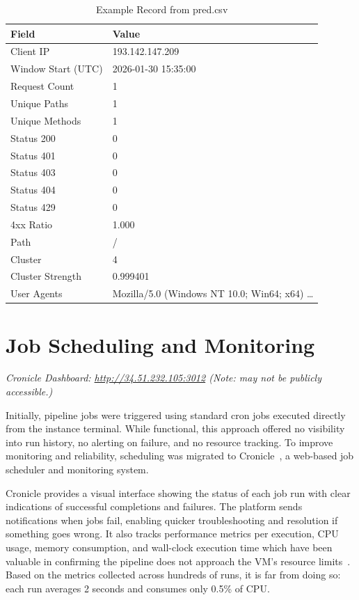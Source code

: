 \documentclass[12pt, a4paper]{report}   %
\begin{document}
\begin{table}[H]
  \centering
  \caption{Example Record from pred.csv}
  \label{tab:pred-csv}
  \begin{tabular}{ll}
    \toprule
    \textbf{Field} & \textbf{Value} \\
    \midrule
    Client IP          & 193.142.147.209 \\
    Window Start (UTC) & 2026-01-30 15:35:00 \\
    Request Count      & 1 \\
    Unique Paths       & 1 \\
    Unique Methods     & 1 \\
    Status 200         & 0 \\
    Status 401         & 0 \\
    Status 403         & 0 \\
    Status 404         & 0 \\
    Status 429         & 0 \\
    4xx Ratio          & 1.000 \\
    Path               & / \\
    Cluster            & 4 \\
    Cluster Strength   & 0.999401 \\
    User Agents        & Mozilla/5.0 (Windows NT 10.0; Win64; x64) \ldots \\
    \bottomrule
  \end{tabular}
\end{table}

\section{Job Scheduling and Monitoring} 

\noindent\textit{\small Cronicle Dashboard: 
\href{http://34.51.232.105:3012}{http://34.51.232.105:3012} 
(Note: may not be publicly accessible.)}

\vspace{0.5em}

Initially, pipeline jobs were triggered using standard cron jobs executed directly
from the instance terminal. While functional, this approach offered no visibility
into run history, no alerting on failure, and no resource tracking. To improve
monitoring and reliability, scheduling was migrated to
Cronicle~\cite{cronicle}, a web-based job scheduler and monitoring system.

Cronicle provides a visual interface showing the status of each job run with clear
indications of successful completions and failures. The platform sends notifications
when jobs fail, enabling quicker troubleshooting and resolution if something goes
wrong. It also tracks performance metrics per execution, CPU usage, memory
consumption, and wall-clock execution time which have been valuable in confirming
the pipeline does not approach the VM's resource limits~\cite{cronicle}. Based on 
the metrics collected across hundreds of runs, it is far from doing so: each run 
averages 2 seconds and consumes only 0.5\% of CPU.
\end{document}
